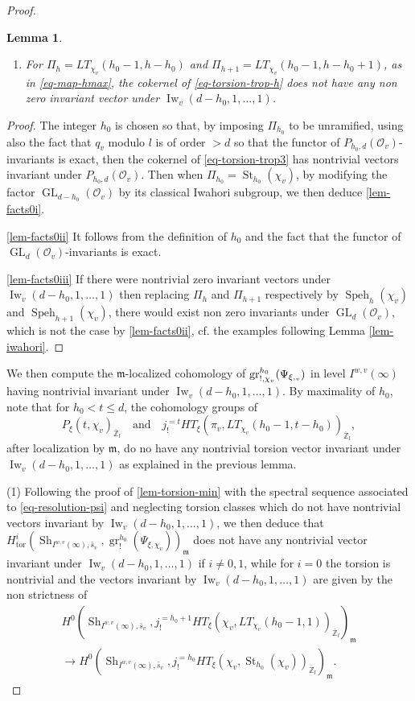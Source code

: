 \documentclass[11pt]{article}
\makeatletter
\newcommand{\cf}{cf.\xspace}
\DeclareRobustCommand{\mathbbm}[1]{\csname jepbb@#1\endcsname}
\let\mathds\mathbbm
\newenvironment{enumeratei}
{\bgroup\def\theenumi{\roman{enumi}}\def\theenumii{\arabic{enumii}}\begin{enumerate}}
{\end{enumerate}\egroup}
\DeclareMathOperator{\GL}{GL}
\newcommand{\tor}{\mathrm{tor}}
\theoremstyle{plain}
\newtheorem{lemma}[equation]{Lemma}
\theoremstyle{definition}
\numberwithin{equation}{subsection}
\newcommand\Zm{{\mathbb Z}}
\newcommand\OC{{\mathcal O}}
\DeclareMathOperator{\sh}{Sh}
\DeclareMathOperator{\Iw}{Iw}
\DeclareMathOperator{\speh}{Speh}
\DeclareMathOperator{\st}{St}
\DeclareMathOperator{\gr}{gr}
\let \oo=\infty
\makeatother
\begin{document}
\begin{proof}
\begin{lemma}
\begin{enumeratei}
\item\label{lem-facts0iii} For $\Pi_h=LT_{\chi_v}(h_0-1,h-h_0)$ and
$\Pi_{h+1}=LT_{\chi_v}(h_0-1,h-h_0+1)$, as in \eqref{eq-map-hmax},
the cokernel of \eqref{eq-torsion-trop-h} does not have any non zero invariant vector under
$\Iw_v(d-h_0,1,\dots,1)$.
\end{enumeratei}
\end{lemma}

\begin{proof}
The integer $h_0$ is chosen so that, by imposing $\Pi_{h_0}$ to be unramified,
using also the fact that $q_v$ modulo $l$ is of order $>d$ so that the functor of $P_{h_0,d}(\OC_v)$-invariants is exact,
then the cokernel of \eqref{eq-torsion-trop3}
has nontrivial vectors invariant under $P_{h_0,d}(\OC_v)$.
Then when $\Pi_{h_0}=\st_{h_0}(\chi_v)$, by modifying the factor
$\GL_{d-h_0}(\OC_v)$ by its classical Iwahori subgroup, we then deduce \eqref{lem-facts0i}.

\eqref{lem-facts0ii} It follows from the definition of $h_0$ and the fact that
the functor of $\GL_d(\OC_v)$-invariants is exact.

\eqref{lem-facts0iii} If there were nontrivial zero invariant vectors under $\Iw_v(d-h_0,1,\dots,1)$
then replacing $\Pi_h$ and $\Pi_{h+1}$ respectively by $\speh_h(\chi_v)$ and
$\speh_{h+1}(\chi_v)$, there would exist non zero invariants under
$\GL_d(\OC_v)$, which is not the case by \eqref{lem-facts0ii}, \cf the examples following
Lemma \ref{lem-iwahori}.
\end{proof}

We then compute the $\mathfrak m$-localized cohomology of
$\gr^{h_0}_{!,\chi_v}(\Psi_{\xi,\mathds 1_v})$
in level $I^{w,v}(\oo)$ having nontrivial invariant under
$\Iw_v(d-h_0,1,\dots,1)$.
By maximality of $h_0$, note that for $h_0<t \leq d$, the cohomology groups of
\[
P_\xi(t,\chi_v)_{\overline \Zm_l}\quad\text{and}\quad j^{=t}_! HT_\xi(\pi_v,LT_{\chi_v}(h_0-1,t-h_0))_{\overline \Zm_l},
\]
after localization by $\mathfrak m$, do no
have any nontrivial torsion vector invariant under \hbox{$\Iw_v(d-h_0,1,\dots,1)$}
as explained in the previous lemma.

(1) Following the proof of \ref{lem-torsion-min} with the spectral sequence
associated to
\eqref{eq-resolution-psi} and neglecting torsion classes
which do not have nontrivial vectors invariant by \hbox{$\Iw_v(d-h_0,1,\dots,1)$},
we then deduce that
$H^i_{\tor}(\sh_{I^{w,v}(\oo),\bar s_v},
\gr^{h_0}_{!}(\Psi_{\xi,\chi_v}))_{\mathfrak m}$ does not have any nontrivial vector invariant under $\Iw_v(d-h_0,1,\dots,1)$ if $i \neq 0,1$,
while for $i=0$ the torsion is nontrivial and the
vectors invariant by $\Iw_v(d-h_0,1,\dots,1)$ are given by the non strictness of
\begin{multline} \label{eq-torsion-trop}
H^{0}(\sh_{I^{w,v}(\oo),\bar s_v},j^{=h_0+1}_! HT_\xi(\chi_v,LT_{\chi_v}(h_0-1,1))_{\overline \Zm_l})_{\mathfrak m} \\
\to H^0(\sh_{I^{w,v}(\oo),\bar s_v},j^{=h_0}_!
HT_\xi(\chi_v,\st_{h_0}(\chi_v))_{\overline \Zm_l})_{\mathfrak m}.
\end{multline}


\end{proof}
\end{document}
